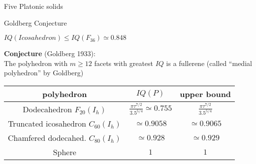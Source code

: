 \documentclass[%
pdf,
colorBG,
slideColor,
]{prosper}
\begin{document}
\begin{slide}{Five Platonic solids}
\vspace{-5mm}
\begin{center}
\begin{minipage}[t]{3.5cm}
\end{minipage}
\begin{minipage}[t]{3.5cm}
\end{minipage}
\begin{minipage}[t]{3.5cm}
\end{minipage}
\begin{minipage}[t]{3.5cm}
\end{minipage}
\begin{minipage}[t]{3.5cm}
\end{minipage}
\end{center}

\end{slide}



\begin{slide}{Goldberg Conjecture}
\vspace{-7mm}
\begin{center}
\begin{center}
\end{center}
$IQ(Icosahedron)  \leq IQ(F_{36})\simeq 0.848$
\end{center}

{\bf Conjecture} (Goldberg 1933):\\
The polyhedron with $m\geq 12$ facets with greatest $IQ$ is a fullerene (called ``medial polyhedron'' by Goldberg)

\begin{center}
\begin{tabular}{|c|c|c|}
\hline
polyhedron & $IQ(P)$  & upper bound\\
\hline\hline
Dodecahedron $F_{20}(I_h)$& $\frac{\pi \tau^{7/2}}{3.5^{5/4}}\simeq 0.755$ & $\frac{\pi \tau^{7/2}}{3.5^{5/4}}$\\\hline
Truncated icosahedron $C_{60}(I_h)$&$\simeq 0.9058$ & $\simeq 0.9065$\\\hline
Chamfered dodecahed. $C_{80}(I_h)$&$\simeq 0.928$ & $\simeq 0.929$\\\hline
Sphere &$1$ & $1$\\\hline\hline
\end{tabular}
\end{center}

\end{slide}
\end{document}
